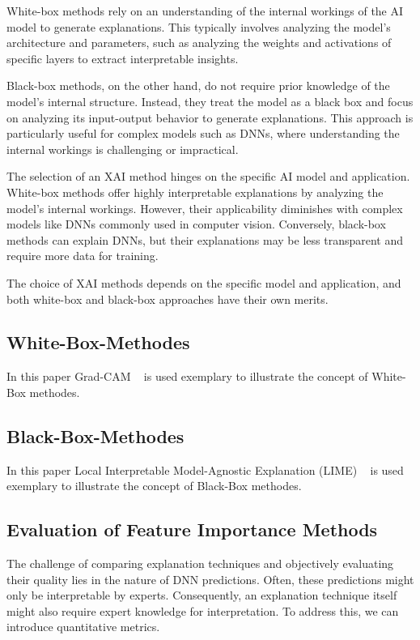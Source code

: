 \documentclass{article}
\begin{document}
White-box methods rely on an understanding of the internal workings of the AI model to generate explanations. This typically involves analyzing the model's architecture and parameters, such as analyzing the weights and activations of specific layers to extract interpretable insights.

Black-box methods, on the other hand, do not require prior knowledge of the model's internal structure. Instead, they treat the model as a black box and focus on analyzing its input-output behavior to generate explanations. This approach is particularly useful for complex models such as DNNs, where understanding the internal workings is challenging or impractical.

The selection of an XAI method hinges on the specific AI model and application. White-box methods offer highly interpretable explanations by analyzing the model's internal workings. However, their applicability diminishes with complex models like DNNs commonly used in computer vision. Conversely, black-box methods can explain DNNs, but their explanations may be less transparent and require more data for training.

The choice of XAI methods depends on the specific model and application, and both white-box and black-box approaches have their own merits.


\subsection{White-Box-Methodes}
In this paper Grad-CAM ~\cite{Selvaraju_2019} is used exemplary to illustrate the concept of White-Box methodes.



\subsection{Black-Box-Methodes}
In this paper Local Interpretable Model-Agnostic Explanation (LIME) ~\cite{ribeiro2016why} is used exemplary to illustrate the concept of Black-Box methodes.


\subsection{Evaluation of Feature Importance Methods}

The challenge of comparing explanation techniques and objectively evaluating their quality lies in the nature of DNN predictions. Often, these predictions might only be interpretable by experts. Consequently, an explanation technique itself might also require expert knowledge for interpretation. To address this, we can introduce quantitative metrics.
\end{document}
